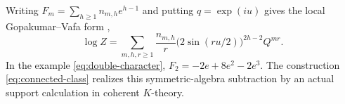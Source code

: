 Writing $F_m=\sum_{h\ge1} n_{m,h} e^{h-1}$ and putting $q=\exp(iu)$
gives the local Gopakumar--Vafa form \cite{gv,bryanpandharipande},
\begin{equation}
 \log Z=\sum_{m,h,r\ge1} \frac{n_{m,h}}{r}
        \bigl(2\sin(ru/2)\bigr)^{2h-2} Q^{mr}.
\end{equation}
In the example \eqref{eq:double-character}, $F_2=-2e+8e^2-2e^3$.
The construction \eqref{eq:connected-class} realizes this
symmetric-algebra subtraction by an actual support calculation in
coherent $K$-theory.
